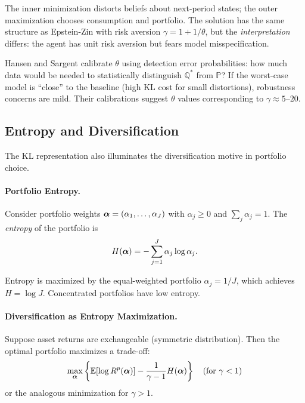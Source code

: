 The inner minimization distorts beliefs about next-period states; the outer maximization chooses consumption and portfolio. The solution has the same structure as Epstein-Zin with risk aversion $\gamma = 1 + 1/\theta$, but the \emph{interpretation} differs: the agent has unit risk aversion but fears model misspecification.

\begin{calloutnote}
Hansen and Sargent calibrate $\theta$ using detection error probabilities: how much data would be needed to statistically distinguish $\mathbb{Q}^*$ from $\mathbb{P}$? If the worst-case model is ``close'' to the baseline (high KL cost for small distortions), robustness concerns are mild. Their calibrations suggest $\theta$ values corresponding to $\gamma \approx 5$--$20$.
\end{calloutnote}

\subsection{Entropy and Diversification}
\label{subsec:entropy-diversification}

The KL representation also illuminates the diversification motive in portfolio choice.

\paragraph{Portfolio Entropy.}

Consider portfolio weights $\boldsymbol{\alpha} = (\alpha_1, \ldots, \alpha_J)$ with $\alpha_j \geq 0$ and $\sum_j \alpha_j = 1$. The \emph{entropy} of the portfolio is
\begin{equation}
H(\boldsymbol{\alpha}) = -\sum_{j=1}^{J} \alpha_j \log \alpha_j.
\label{eq:portfolio-entropy}
\end{equation}

Entropy is maximized by the equal-weighted portfolio $\alpha_j = 1/J$, which achieves $H = \log J$. Concentrated portfolios have low entropy.

\paragraph{Diversification as Entropy Maximization.}

Suppose asset returns are exchangeable (symmetric distribution). Then the optimal portfolio maximizes a trade-off:
\begin{equation}
\max_{\boldsymbol{\alpha}} \left\{ \mathbb{E}[\log R^p(\boldsymbol{\alpha})] - \frac{1}{\gamma - 1} H(\boldsymbol{\alpha}) \right\} \quad \text{(for } \gamma < 1 \text{)}
\label{eq:entropy-tradeoff}
\end{equation}
or the analogous minimization for $\gamma > 1$.

